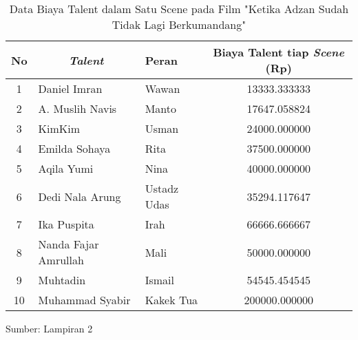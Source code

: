 {    \begin{table}
        \centering
        \caption{Data Biaya Talent dalam Satu Scene pada Film "Ketika Adzan Sudah Tidak Lagi Berkumandang"}
        \label{tab: data biaya talent}
        \begin{tabular}{|c|l|l|c|}
            \hline
            \textbf{No} & \multicolumn{1}{c|}{\textit{\textbf{Talent}}} & \textbf{Peran} & \textbf{Biaya Talent tiap \textit{Scene} (Rp)} \\ \hline
            1           & Daniel Imran                                  & Wawan          & 13333.333333                                   \\ \hline
            2           & A. Muslih Navis                               & Manto          & 17647.058824                                   \\ \hline
            3           & KimKim                                        & Usman          & 24000.000000                                   \\ \hline
            4           & Emilda Sohaya                                 & Rita           & 37500.000000                                   \\ \hline
            5           & Aqila Yumi                                    & Nina           & 40000.000000                                   \\ \hline
            6           & Dedi Nala Arung                               & Ustadz Udas    & 35294.117647                                   \\ \hline
            7           & Ika Puspita                                   & Irah           & 66666.666667                                   \\ \hline
            8           & Nanda Fajar Amrullah                          & Mali           & 50000.000000                                   \\ \hline
            9           & Muhtadin                                      & Ismail         & 54545.454545                                   \\ \hline
            10          & Muhammad Syabir                               & Kakek Tua      & 200000.000000                                  \\ \hline
        \end{tabular}
    \end{table}

    \vspace{-8mm}
    \begin{flushright}
        Sumber: Lampiran 2
    \end{flushright}

}
